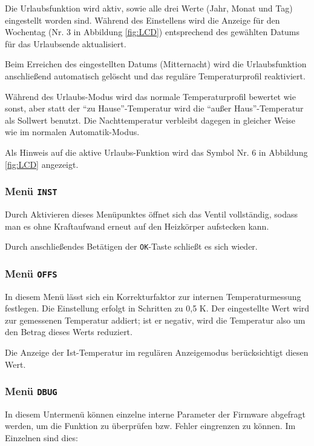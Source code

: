 \documentclass[a5paper]{article}
\begin{document}
Die Urlaubsfunktion wird aktiv, sowie alle drei Werte (Jahr, Monat
und Tag) eingestellt worden sind.  Während des Einstellens wird
die Anzeige für den Wochentag (Nr. 3 in Abbildung \ref{fig:LCD}) entsprechend
des gewählten Datums für das Urlaubsende aktualisiert.

Beim Erreichen des eingestellten Datums (Mitternacht) wird die
Urlaubsfunktion anschließend automatisch gelöscht und das reguläre
Temperaturprofil reaktiviert.

Während des Urlaubs-Modus wird das normale Temperaturprofil bewertet
wie sonst, aber statt der "`zu Hause"'-Temperatur wird die "`außer
Haus"'-Temperatur als Sollwert benutzt.  Die Nachttemperatur
verbleibt dagegen in gleicher Weise wie im normalen Automatik-Modus.

Als Hinweis auf die aktive Urlaubs-Funktion wird das Symbol Nr. 6
in Abbildung \ref{fig:LCD} angezeigt.

\subsubsection {
  Menü \texttt{INST}
}

Durch Aktivieren dieses Menüpunktes öffnet sich das Ventil
vollständig, sodass man es ohne Kraftaufwand erneut auf
den Heizkörper aufstecken kann.

Durch anschließendes Betätigen der \texttt{OK}-Taste schließt
es sich wieder.

\subsubsection {
  Menü \texttt{OFFS}
}

In diesem Menü lässt sich ein Korrekturfaktor zur internen
Temperaturmessung festlegen.  Die Einstellung erfolgt in Schritten zu
0,5 K.  Der eingestellte Wert wird zur gemessenen Temperatur addiert;
ist er negativ, wird die Temperatur also um den Betrag dieses Werts
reduziert.

Die Anzeige der Ist-Temperatur im regulären Anzeigemodus
berücksichtigt diesen Wert.

\subsubsection {
  Menü \texttt{DBUG}
}

In diesem Untermenü können einzelne interne Parameter der Firmware
abgefragt werden, um die Funktion zu überprüfen bzw. Fehler eingrenzen
zu können.  Im Einzelnen sind dies:
\end{document}
